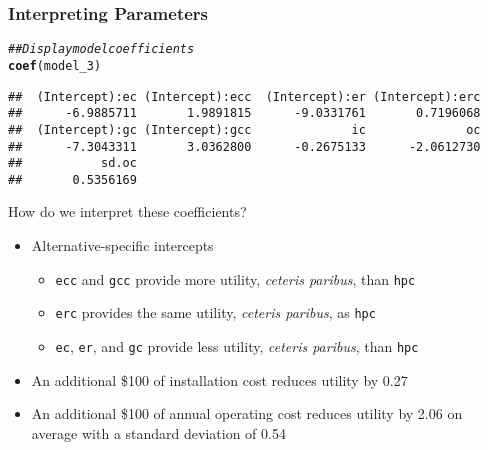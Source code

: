 \documentclass{beamer}\usepackage[]{graphicx}\usepackage[]{color}
\makeatletter
\newcommand{\hlcom}[1]{\textcolor[rgb]{0.678,0.584,0.686}{\textit{#1}}}%
\newcommand{\hlstd}[1]{\textcolor[rgb]{0.345,0.345,0.345}{#1}}%
\newcommand{\hlkwd}[1]{\textcolor[rgb]{0.737,0.353,0.396}{\textbf{#1}}}%
\newenvironment{kframe}{%
 \def\at@end@of@kframe{}%
 \ifinner\ifhmode%
  \def\at@end@of@kframe{\end{minipage}}%
  \begin{minipage}{\columnwidth}%
 \fi\fi%
 \def\FrameCommand##1{\hskip\@totalleftmargin \hskip-\fboxsep
 \colorbox{shadecolor}{##1}\hskip-\fboxsep
     \hskip-\linewidth \hskip-\@totalleftmargin \hskip\columnwidth}%
 \MakeFramed {\advance\hsize-\width
   \@totalleftmargin\z@ \linewidth\hsize
   \@setminipage}}%
 {\par\unskip\endMakeFramed%
 \at@end@of@kframe}
\newenvironment{knitrout}{}{} %
\makeatother
\begin{document}
\begin{frame}[fragile]\frametitle{Interpreting Parameters}
\begin{knitrout}\footnotesize
{}\color{fgcolor}\begin{kframe}
\begin{alltt}
\hlcom{## Display model coefficients}
\hlkwd{coef}\hlstd{(model_3)}
\end{alltt}
\begin{verbatim}
##  (Intercept):ec (Intercept):ecc  (Intercept):er (Intercept):erc 
##      -6.9885711       1.9891815      -9.0331761       0.7196068 
##  (Intercept):gc (Intercept):gcc              ic              oc 
##      -7.3043311       3.0362800      -0.2675133      -2.0612730 
##           sd.oc 
##       0.5356169
\end{verbatim}
\end{kframe}
\end{knitrout}
    \vspace{2ex}
    How do we interpret these coefficients?
    \begin{itemize}
    	\item Alternative-specific intercepts
    	\begin{itemize}
    		\item \texttt{ecc} and \texttt{gcc} provide more utility, \emph{ceteris paribus}, than \texttt{hpc}
	        \item \texttt{erc} provides the same utility, \emph{ceteris paribus}, as \texttt{hpc}
	        \item \texttt{ec}, \texttt{er}, and \texttt{gc} provide less utility, \emph{ceteris paribus}, than \texttt{hpc}
    	\end{itemize}
        \item An additional \$100 of installation cost reduces utility by 0.27
        \item An additional \$100 of annual operating cost reduces utility by 2.06 on average with a standard deviation of 0.54
    \end{itemize}
\end{frame}
\end{document}

